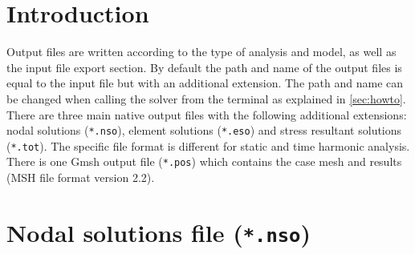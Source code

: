 \documentclass[a4paper,fleqn]{book}
\begin{document}
\label{ch:output_files}

\section{Introduction}

Output files are written according to the type of analysis and model, as well as the input file export section. By default the path and name of the output files is equal to the input file but with an additional extension. The path and name can be changed when calling the solver from the terminal as explained in \ref{sec:howto}. There are three main native output files with the following additional extensions: nodal solutions (\texttt{*.nso}), element solutions (\texttt{*.eso}) and stress resultant solutions (\texttt{*.tot}). The specific file format is different for static and time harmonic analysis. There is one Gmsh output file (\texttt{*.pos}) which contains the case mesh and results (MSH file format version 2.2).

\section{Nodal solutions file (\texttt{*.nso})}

\end{document}
